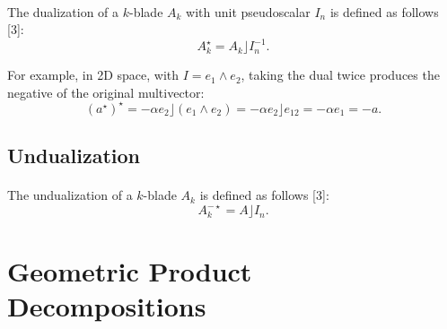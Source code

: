 \documentclass{article}
\begin{document}
\paragraph{}The dualization of a $k$-blade $A_k$ with unit pseudoscalar $I_n$ is defined as follows [3]:
$$A_k^{\star} = {A_k} \rfloor I_n^{-1}.$$

For example, in 2D space, with $I = e_1 \wedge e_2$, taking the dual twice produces the negative of the original multivector:
$$(a^\star)^\star = -\alpha e_2 \rfloor (e_1 \wedge e_2) = -\alpha e_2 \rfloor e_{12} = -\alpha e_1 = -a.$$

\subsection{\textbf{Undualization}}

\paragraph{}The undualization of a $k$-blade $A_k$ is defined as follows [3]:
$$A_k^{-\star} = A \rfloor I_n.$$

\section{Geometric Product Decompositions}
\end{document}
